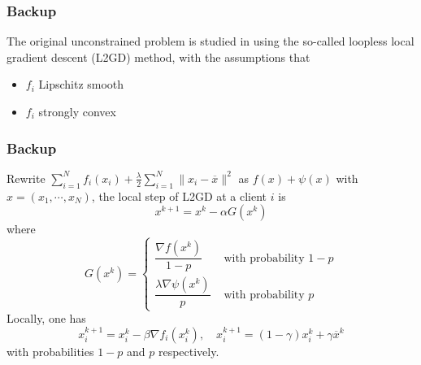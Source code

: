 
\begin{frame}
\frametitle{Backup}

The original unconstrained problem is studied in \cite{hanzely2020federated} using the so-called loopless local gradient descent (L2GD) method, with the assumptions that
\begin{itemize}
    \item $f_i$ Lipschitz smooth
    \item $f_i$ strongly convex
\end{itemize}

\end{frame}


\begin{frame}
\frametitle{Backup}

Rewrite $\sum\limits_{i=1}^N f_i(x_i) + \frac{\lambda}{2} \sum\limits_{i=1}^N \lVert x_i - \overline{x} \rVert^2$ as $f(x) + \psi(x)$ with $x = (x_1,\cdots,x_N)$, the local step of L2GD at a client $i$ is
$$x^{k+1} = x^k - \alpha G(x^k)$$
where
$$
G(x^k) = \begin{cases}
\dfrac{\nabla f(x^k)}{1-p} & \text{ with probability } 1-p \\
\dfrac{\lambda \nabla \psi(x^k)}{p} & \text{ with probability } p 
\end{cases}
$$
Locally, one has
$$x_i^{k+1} = x_i^k - \beta \nabla f_i(x_i^k), \quad x_i^{k+1} = (1-\gamma)x_i^k + \gamma \overline{x}^k$$
with probabilities $1-p$ and $p$ respectively.

\end{frame}










